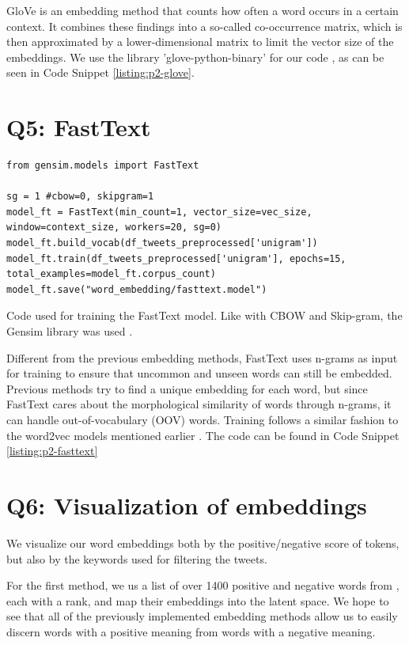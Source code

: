 GloVe \cite{glove} is an embedding method that counts how often a word occurs in a certain context. It combines these findings into a so-called co-occurrence matrix, which is then approximated by a lower-dimensional matrix to limit the vector size of the embeddings.
We use the library 'glove-python-binary' for our code \cite{glovegit}, as can be seen in Code Snippet \ref{listing:p2-glove}.

\section*{Q5: FastText}
\begin{listing*}
\begin{verbatim}
from gensim.models import FastText

sg = 1 #cbow=0, skipgram=1
model_ft = FastText(min_count=1, vector_size=vec_size, window=context_size, workers=20, sg=0)
model_ft.build_vocab(df_tweets_preprocessed['unigram'])
model_ft.train(df_tweets_preprocessed['unigram'], epochs=15, total_examples=model_ft.corpus_count)
model_ft.save("word_embedding/fasttext.model")
\end{verbatim}
\caption{Code used for training the FastText model. Like with CBOW and Skip-gram, the Gensim library was used \cite{gensim}.}
\label{listing:p2-fasttext}
\end{listing*}

Different from the previous embedding methods, FastText \cite{fasttext} uses n-grams as input for training to ensure that uncommon and unseen words can still be embedded. Previous methods try to find a unique embedding for each word, but since FastText cares about the morphological similarity of words through n-grams, it can handle out-of-vocabulary (OOV) words. Training follows a similar fashion to the word2vec models mentioned earlier \cite{cbowsgram}.
The code can be found in Code Snippet \ref{listing:p2-fasttext}

\section*{Q6: Visualization of embeddings}
We visualize our word embeddings both by the positive/negative score of tokens, but also by the keywords used for filtering the tweets.

For the first method, we us a list of over 1400 positive and negative words from \cite{AFINN}, each with a rank, and map their embeddings into the latent space. We hope to see that all of the previously implemented embedding methods allow us to easily discern words with a positive meaning from words with a negative meaning.

